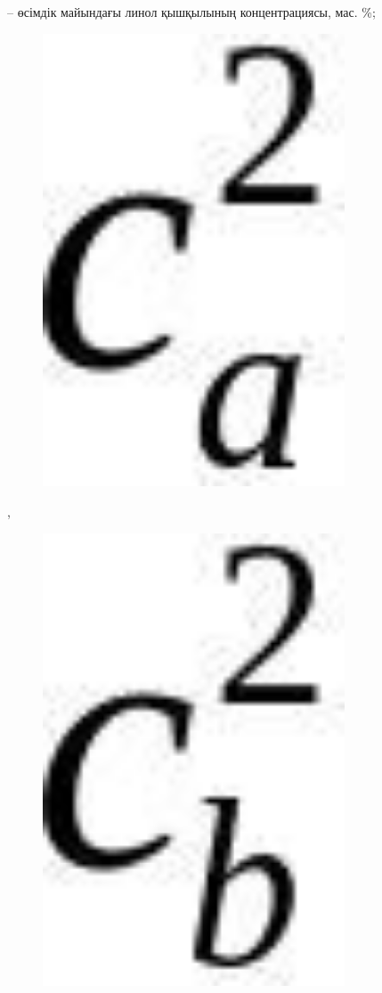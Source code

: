 \begin{figure}[H]
	\caption*{}
\end{figure}
-- өсімдік майындағы линол қышқылының концентрациясы, мас. \%;

\begin{figure}[H]
	\centering
	\includegraphics[width=0.8\textwidth]{assets/1103}
	\caption*{}
\end{figure}, \begin{figure}[H]
	\centering
	\includegraphics[width=0.8\textwidth]{assets/1104}

\end{figure}
